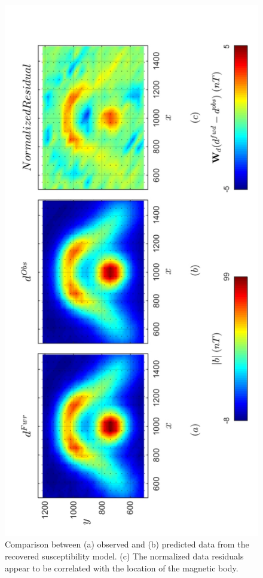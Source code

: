\begin{figure}[h!]
\centering
\includegraphics[scale=0.52, angle =270]{3D_Inv_l2l2_pred_INDUCED.pdf}
\caption{ Comparison between (a) observed and (b) predicted data from the recovered susceptibility model. (c) The normalized data residuals appear to be correlated with the location of the magnetic body.}
\label{fig:3D_Inv_l2l2_pred_INDUCED}
\end{figure}

